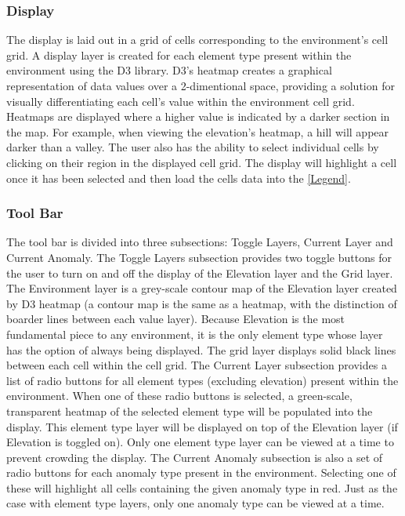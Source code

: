 \subsubsection{Display}
The display is laid out in a grid of cells corresponding to the environment's cell grid.
A display layer is created for each element type present within the environment using the D3 library.
D3's heatmap creates a graphical representation of data values over a 2-dimentional space, providing a solution for visually differentiating each cell's value within the environment cell grid.
Heatmaps are displayed where a higher value is indicated by a darker section in the map.
For example, when viewing the elevation's heatmap, a hill will appear darker than a valley.
The user also has the ability to select individual cells by clicking on their region in the displayed cell grid.
The display will highlight a cell once it has been selected and then load the cells data into the \ref{Legend}.


\subsubsection{Tool Bar}
The tool bar is divided into three subsections: Toggle Layers, Current Layer and Current Anomaly.
The Toggle Layers subsection provides two toggle buttons for the user to turn on and off the display of the Elevation layer and the Grid layer.
The Environment layer is a grey-scale contour map of the Elevation layer created by D3 heatmap (a contour map is the same as a heatmap, with the distinction of boarder lines between each value layer).
Because Elevation is the most fundamental piece to any environment, it is the only element type whose layer has the option of always being displayed.
The grid layer displays solid black lines between each cell within the cell grid.
The Current Layer subsection provides a list of radio buttons for all element types (excluding elevation) present within the environment.
When one of these radio buttons is selected, a green-scale, transparent heatmap of the selected element type will be populated into the display.
This element type layer will be displayed on top of the Elevation layer (if Elevation is toggled on).
Only one element type layer can be viewed at a time to prevent crowding the display.
The Current Anomaly subsection is also a set of radio buttons for each anomaly type present in the environment.
Selecting one of these will highlight all cells containing the given anomaly type in red.
Just as the case with element type layers, only one anomaly type can be viewed at a time.


